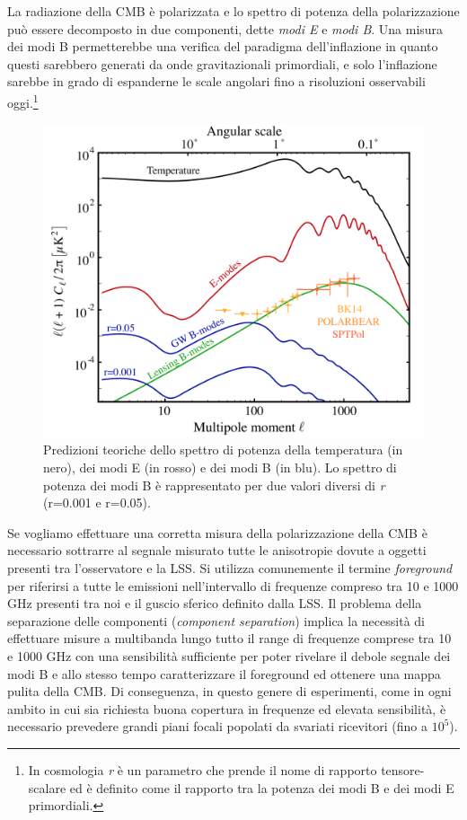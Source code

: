\documentclass[12pt,a4paper,final]{book}
\begin{document}
La radiazione della CMB è polarizzata e lo spettro di potenza della polarizzazione può essere decomposto in due componenti, dette \textit{modi E} e \textit{modi B}. Una misura dei modi B permetterebbe una verifica del paradigma dell'inflazione in quanto questi sarebbero generati da onde gravitazionali primordiali, e solo l'inflazione sarebbe in grado di espanderne le scale angolari fino a risoluzioni osservabili oggi.\footnote{In cosmologia \textit{r} è un parametro che prende il nome di rapporto tensore-scalare ed è definito come il rapporto tra la potenza dei modi B e dei modi E primordiali.}
\begin{figure}[!ht]
	\centering
	\includegraphics[width=0.7\linewidth]{../figures/power_spect.png}
	\caption{Predizioni teoriche dello spettro di potenza della temperatura (in nero), dei modi E (in rosso) e dei modi B (in blu). Lo spettro di potenza dei modi B è rappresentato per due valori diversi di \textit{r} (r=0.001 e r=0.05)\cite{libro_CMB}.}
	\label{power_spect}
\end{figure}

Se vogliamo effettuare una corretta misura della polarizzazione della CMB è necessario sottrarre al segnale misurato tutte le anisotropie dovute a oggetti presenti tra l'osservatore e la LSS. Si utilizza comunemente il termine \textit{foreground} per riferirsi a tutte le emissioni nell'intervallo di frequenze compreso tra 10 e 1000 GHz presenti tra noi e il guscio sferico definito dalla LSS.
Il problema della separazione delle componenti (\textit{component separation}) implica la necessità di effettuare misure a multibanda lungo tutto il range di frequenze comprese tra 10 e 1000 GHz con una sensibilità sufficiente per poter rivelare il debole segnale dei modi B e allo stesso tempo caratterizzare il foreground ed ottenere una mappa pulita della CMB. Di conseguenza, in questo genere di esperimenti, come in ogni ambito in cui sia richiesta buona copertura in frequenze ed elevata sensibilità, è necessario prevedere grandi piani focali popolati da svariati ricevitori (fino a $10^5$).
\end{document}
